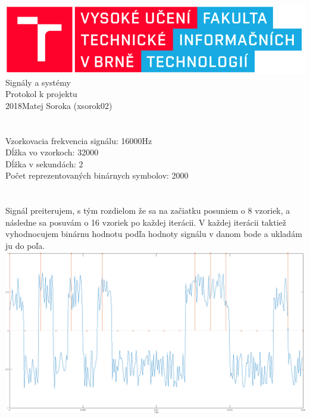 \documentclass[a4paper,12pt,twocolumn]{article}
\begin{document}
\begin{titlepage}
  \begin{center}
	\includegraphics[origin=c,scale=0.5]{fit}
	\\[60mm]
    {\Huge Signály a systémy}\\[5mm]
	{\Huge Protokol k projektu}\\[5mm]
    \Large{2018}\hfill Matej Soroka (xsorok02)
  \end{center}
\end{titlepage}

\section{}
Vzorkovacia frekvencia signálu: 16000Hz\\
Dĺžka vo vzorkoch: 32000\\
Dĺžka v sekundách: 2\\
Počet reprezentovaných binárnych symbolov: 2000
\section{}
Signál preiterujem, s tým rozdielom že sa na začiatku posuniem o 8 vzoriek, a následne sa posuvám o 16 vzoriek po každej iterácii. V každej iterácii taktiež vyhodnocujem binárnu hodnotu podľa hodnoty signálu v danom bode a ukladám ju do poľa.
\includegraphics[width=\linewidth]{2}
\end{document}
